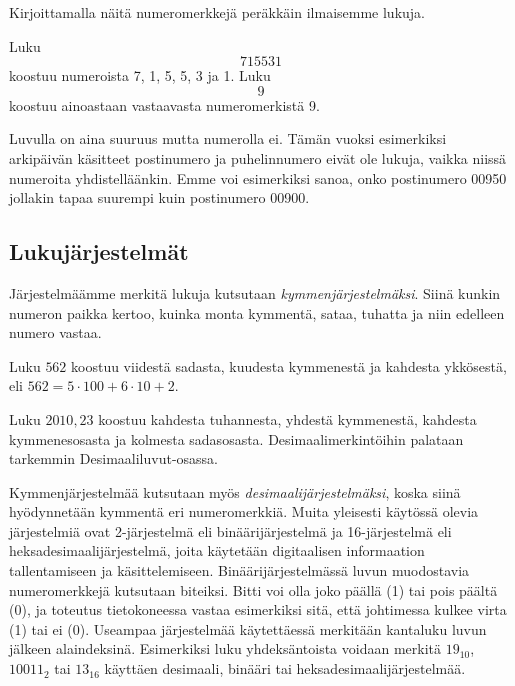 Kirjoittamalla näitä numeromerkkejä peräkkäin ilmaisemme lukuja.


\begin{esimerkki}
Luku \[715531\] koostuu numeroista 7, 1, 5, 5, 3 ja 1.
Luku \[9\] koostuu ainoastaan vastaavasta numeromerkistä 9.
\end{esimerkki}

Luvulla on aina suuruus mutta numerolla ei. Tämän vuoksi esimerkiksi arkipäivän käsitteet postinumero ja puhelinnumero eivät ole lukuja, vaikka niissä numeroita yhdistelläänkin. Emme voi esimerkiksi sanoa, onko postinumero 00950 jollakin tapaa suurempi kuin postinumero 00900.

\subsection*{Lukujärjestelmät}

Järjestelmäämme merkitä lukuja kutsutaan \emph{kymmenjärjestelmäksi}. Siinä kunkin numeron paikka kertoo, kuinka monta kymmentä, sataa, tuhatta ja niin edelleen numero vastaa.

\begin{esimerkki}
Luku $562$ koostuu viidestä sadasta, kuudesta kymmenestä ja kahdesta ykkösestä, eli $562= 5 \cdot 100 + 6 \cdot 10 + 2$.

Luku $2 010,23$ koostuu kahdesta tuhannesta, yhdestä kymmenestä, kahdesta kymmenesosasta ja kolmesta sadasosasta. Desimaalimerkintöihin palataan tarkemmin Desimaaliluvut-osassa.
\end{esimerkki}



Kymmenjärjestelmää kutsutaan myös \emph{desimaalijärjestelmäksi}, koska siinä hyödynnetään kymmentä eri numeromerkkiä. Muita yleisesti käytössä olevia järjestelmiä ovat 2-järjestelmä eli binäärijärjestelmä ja 16-järjestelmä eli heksadesimaalijärjestelmä, joita käytetään digitaalisen informaation tallentamiseen ja käsittelemiseen. Binäärijärjestelmässä luvun muodostavia numeromerkkejä kutsutaan biteiksi. Bitti voi olla joko päällä (1) tai pois päältä (0), ja toteutus tietokoneessa vastaa esimerkiksi sitä, että johtimessa kulkee virta (1) tai ei (0). Useampaa järjestelmää käytettäessä merkitään kantaluku luvun jälkeen alaindeksinä. Esimerkiksi luku yhdeksäntoista voidaan merkitä $19_{10}$, $10011_{2}$ tai $13_{16}$ käyttäen desimaali, binääri tai heksadesimaalijärjestelmää.

